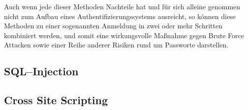 Auch wenn jede dieser Methoden Nachteile hat und für sich alleine genommen nicht zum Aufbau eines Authentifizierungssystems ausreicht, so können diese Methoden zu einer sogenannten Anmeldung in zwei oder mehr Schritten kombiniert werden, und somit eine wirkungsvolle Maßnahme gegen Brute Force Attacken sowie einer Reihe anderer Risiken rund um Passworte darstellen.

\subsection{SQL--Injection}

\subsection{Cross Site Scripting}

